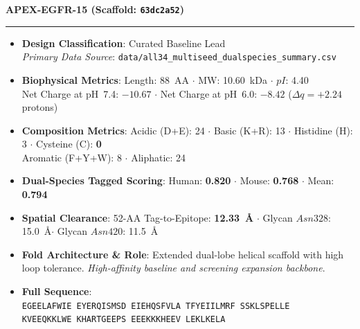 \documentclass[11pt]{article}
\begin{document}
\noindent\textbf{\color{navyblue}\large APEX-EGFR-15  \quad (Scaffold: \texttt{63dc2a52})} \\
\vspace{-0.4em}
\rule{\textwidth}{0.6pt}
\vspace{-0.2em}
\begin{itemize}
  \setlength{\itemsep}{2pt}
  \setlength{\parskip}{0pt}
  \item \textbf{Design Classification}: Curated Baseline Lead \\
    \textit{Primary Data Source}: \texttt{\small data/all34\_multiseed\_dualspecies\_summary.csv}
  \item \textbf{Biophysical Metrics}: Length: 88~AA $\cdot$ MW: 10.60~kDa $\cdot$ $pI$: 4.40 \\
    Net Charge at pH~7.4: $-10.67$ $\cdot$ Net Charge at pH~6.0: $-8.42$ ($\Delta q = +2.24$ protons)
  \item \textbf{Composition Metrics}: Acidic (D+E): 24 $\cdot$ Basic (K+R): 13 $\cdot$ Histidine (H): 3 $\cdot$ Cysteine (C): \textbf{0} \\
    Aromatic (F+Y+W): 8 $\cdot$ Aliphatic: 24
  \item \textbf{Dual-Species Tagged Scoring}: Human: \textbf{0.820} $\cdot$ Mouse: \textbf{0.768} $\cdot$ Mean: \textbf{0.794}
  \item \textbf{Spatial Clearance}: 52-AA Tag-to-Epitope: \textbf{12.33~\AA} $\cdot$ Glycan $Asn328$: 15.0~\AA $\cdot$ Glycan $Asn420$: 11.5~\AA
  \item \textbf{Fold Architecture \& Role}: Extended dual-lobe helical scaffold with high loop tolerance. \textit{High-affinity baseline and screening expansion backbone}.
  \item \textbf{Full Sequence}: \\
    \texttt{\small EGEELAFWIE EYERQISMSD EIEHQSFVLA TFYEIILMRF SSKLSPELLE \\
    KVEEQKKLWE KHARTGEEPS EEEKKKHEEV LEKLKELA}
\end{itemize}
\vspace{0.8em}
\end{document}
